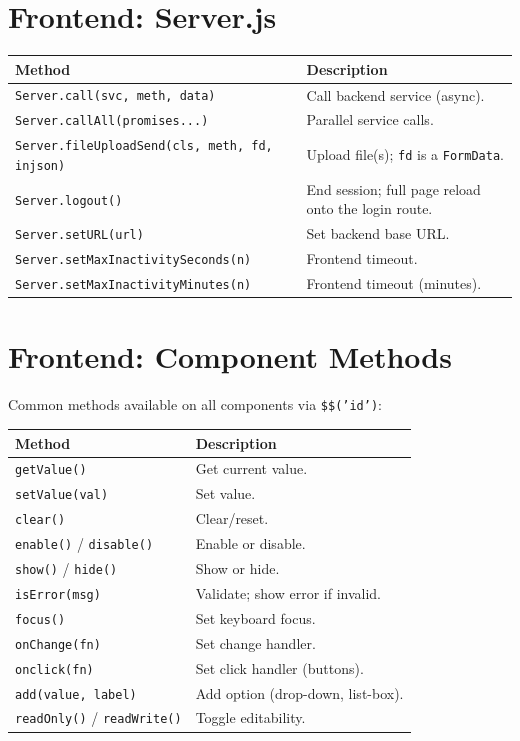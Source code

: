 \section{Frontend: Server.js}
\label{sec:api-serverjs}

\begin{longtable}{P{4.8cm}P{5.7cm}}
\toprule
\textbf{Method} & \textbf{Description} \\
\midrule
\endhead
\texttt{Server.call(svc, meth, data)} & Call backend service (async). \\
\texttt{Server.\allowbreak callAll(\allowbreak promises...)} & Parallel service calls. \\
\texttt{Server.\allowbreak fileUploadSend(\allowbreak cls, meth, fd, injson)} & Upload file(s); \texttt{fd} is a \texttt{FormData}. \\
\texttt{Server.logout()} & End session; full page reload onto the login route. \\
\texttt{Server.setURL(url)} & Set backend base URL. \\
\texttt{Server.\allowbreak setMaxInactivity\allowbreak Seconds(\allowbreak n)} & Frontend timeout. \\
\texttt{Server.\allowbreak setMaxInactivity\allowbreak Minutes(\allowbreak n)} & Frontend timeout (minutes). \\
\bottomrule
\end{longtable}

\section{Frontend: Component Methods}
\label{sec:api-components}

Common methods available on all components via \texttt{\$\$('id')}:

\begin{longtable}{P{4.8cm}P{5.7cm}}
\toprule
\textbf{Method} & \textbf{Description} \\
\midrule
\endhead
\texttt{getValue()} & Get current value. \\
\texttt{setValue(val)} & Set value. \\
\texttt{clear()} & Clear/reset. \\
\texttt{enable()} / \texttt{disable()} & Enable or disable. \\
\texttt{show()} / \texttt{hide()} & Show or hide. \\
\texttt{isError(msg)} & Validate; show error if invalid. \\
\texttt{focus()} & Set keyboard focus. \\
\texttt{onChange(fn)} & Set change handler. \\
\texttt{onclick(fn)} & Set click handler (buttons). \\
\texttt{add(value, label)} & Add option (drop-down, list-box). \\
\texttt{readOnly()} / \texttt{readWrite()} & Toggle editability. \\
\bottomrule
\end{longtable}

